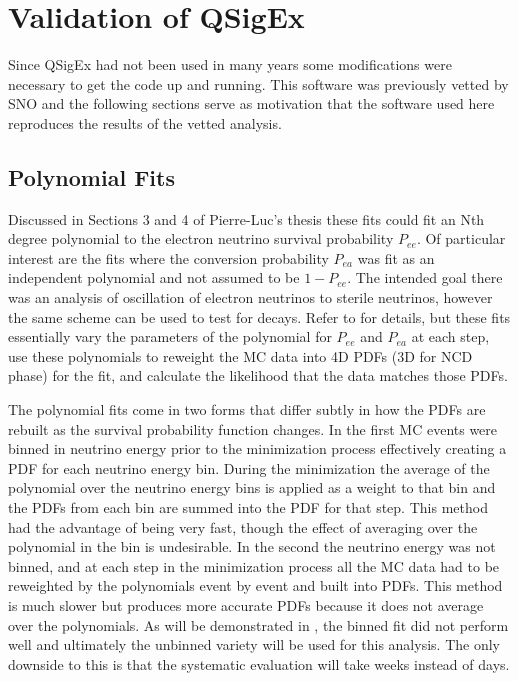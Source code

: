 \chapter{Validation of QSigEx}
\label{qsigex_validation}

Since QSigEx had not been used in many years some modifications were necessary to get the code up and running. 
This software was previously vetted by SNO and the following sections serve as motivation that the software used here reproduces the results of the vetted analysis.

\section{Polynomial Fits}

Discussed in Sections 3 and 4 of Pierre-Luc's thesis \cite{plthesis} these fits could fit an Nth degree polynomial to the electron neutrino survival probability $P_{ee}$. 
Of particular interest are the fits where the conversion probability $P_{ea}$ was fit as an independent polynomial and not assumed to be $1-P_{ee}$. 
The intended goal there was an analysis of oscillation of electron neutrinos to sterile neutrinos, however the same scheme can be used to test for decays.
Refer to \cite{plthesis} for details, but these fits essentially vary the parameters of the polynomial for $P_{ee}$ and $P_{ea}$ at each step, use these polynomials to reweight the MC data into 4D PDFs (3D for NCD phase) for the fit, and calculate the likelihood that the data matches those PDFs. 

The polynomial fits come in two forms that differ subtly in how the PDFs are rebuilt as the survival probability function changes.
In the first MC events were binned in neutrino energy prior to the minimization process effectively creating a PDF for each neutrino energy bin. 
During the minimization the average of the polynomial over the neutrino energy bins is applied as a weight to that bin and the PDFs from each bin are summed into the PDF for that step.
This method had the advantage of being very fast, though the effect of averaging over the polynomial in the bin is undesirable.
In the second the neutrino energy was not binned, and at each step in the minimization process all the MC data had to be reweighted by the polynomials event by event and built into PDFs. 
This method is much slower but produces more accurate PDFs because it does not average over the polynomials.
As will be demonstrated in , the binned fit did not perform well and ultimately the unbinned variety will be used for this analysis.
The only downside to this is that the systematic evaluation will take weeks instead of days.

